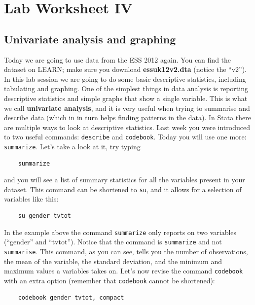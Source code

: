 \section{\hfil Lab Worksheet IV \hfil}
\subsection*{Univariate analysis and graphing}

Today we are going to use data from the ESS 2012 again. You can find the dataset on LEARN; make sure you download \textbf{essuk12v2.dta} (notice the ``v2''). In this lab session we are going to do some basic descriptive statistics, including tabulating and graphing. One of the simplest things in data analysis is reporting descriptive statistics and simple graphs that show a single variable. This is what we call \textbf{univariate analysis}, and it is very useful when trying to summarise and describe data (which in in turn helps finding patterns in the data). In Stata there are multiple ways to look at descriptive statistics. Last week you were introduced to two useful commands: \texttt{describe} and \texttt{codebook}. Today you will use one more: \texttt{summarize}. Let’s take a look at it, try typing

\begin{lstlisting}
	summarize
\end{lstlisting} 

and you will see a list of summary statistics for all the variables present in your dataset. This command can be shortened to \texttt{su}, and it allows for a selection of variables like this:

\begin{lstlisting}
	su gender tvtot
\end{lstlisting}

In the example above the command \texttt{summarize} only reports on two variables (``gender'' and ``tvtot''). Notice that the command is \texttt{summarize} and not \texttt{summarise}. This command, as you can see, tells you the number of observations, the mean of the variable, the standard deviation, and the minimum and maximum values a variables takes on. Let's now revise the command \texttt{codebook} with an extra option (remember that \texttt{codebook} cannot be shortened):

\begin{lstlisting}
	codebook gender tvtot, compact
\end{lstlisting}

